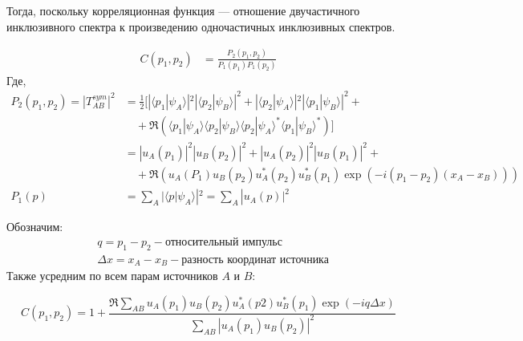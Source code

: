 \documentclass{extarticle}
\begin{document}
    Тогда, поскольку корреляционная функция --- 
    отношение двучастичного инклюзивного спектра 
    к произведению одночастичных инклюзивных спектров.

    \begin{align}
        C(p_1, p_2) &= 
            \frac{
                P_2(p_1, p_2)
            }{
                P_1(p_1)P_1(p_2)
            }
    \end{align}
    Где,
    \begin{align}
        P_2(p_1, p_2) = 
        |T^{sym}_{AB}|^2 &= 
        \frac{1}{2} 
        \bigg[
            |\langle p_{1} | \psi_{A} \rangle|^2 
            |\langle p_{2} | \psi_{B}\rangle|^2 + 
            |\langle p_{2} | \psi_{A} \rangle|^2 
            |\langle p_{1} | \psi_{B}\rangle|^2 + \nonumber \\
            & \quad + \mathfrak{R}
            \left(
                \langle p_{1} | \psi_{A}\rangle 
                \langle p_{2} | \psi_{B}\rangle 
                \langle p_{2} | \psi_{A}\rangle^{*} 
                \langle p_{1} | \psi_{B}\rangle^{*}
            \right)
        \bigg] \nonumber \\
        &= |u_{A}(p_1)|^2 |u_{B}(p_2)|^2 + 
        |u_{A}(p_2)|^2 |u_{B}(p_1)|^2 + \nonumber \\
        & \quad + 
        \mathfrak{R}(
            u_{A}(P_1)
            u_{B}(p_2)
            u^{*}_{A}(p_2)
            u^{*}_{B}(p_1) 
            \exp(-i(p_1 - p_2)(x_{A} - x_{B}))
        )\\
        P_1(p) &= 
            \sum_{A} | \langle p|\psi_{A}\rangle|^2 = 
            \sum_{A} |u_{A}(p)|^2 
    \end{align}

    Обозначим:
    \begin{align*}
        &q = p_{1} - p_{2} 
            - \text{относительный импульс} \\
        &\Delta x = x_{A} 
            - x_{B} - \text{разность координат источника}
    \end{align*}
    Также усредним по всем парам источников $A$ и $B$:

    \begin{equation}
        C (p_1, p_2) = 1 + \frac{
            \mathfrak{R}
            \sum_{AB} 
                u_A(p_1)
                u_B(p_2)
                u^{*}_A(p2)
                u^{*}_B(p_1) 
                \exp(-iq\Delta x)
        }{
            \sum_{AB} 
                |u_A(p_1)u_B(p_2)|^2
        }
    \end{equation}
\end{document}
